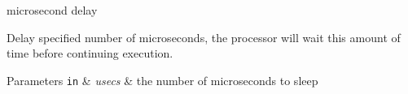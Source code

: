 microsecond delay 

\-Delay specified number of microseconds, the processor will wait this amount of time before continuing execution.


\begin{DoxyParams}[1]{\-Parameters}
\mbox{\tt in}  & {\em usecs} & the number of microseconds to sleep \\
\hline
\end{DoxyParams}
